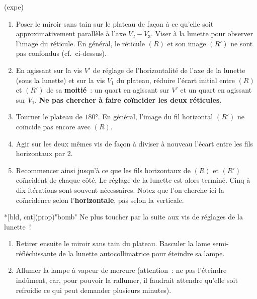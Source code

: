 \documentclass[../main/main.tex]{subfiles}
\begin{document}
\begin{tcb}(expe){}
  \begin{enumerate}
  \item Poser le miroir sans tain sur le plateau de façon à ce qu'elle soit
  approximativement parallèle à l'axe $V_2-V_3$. Viser à la lunette pour
  observer l'image du réticule. En général, le réticule $(R)$ et son image
  $(R')$ ne sont pas  confondus (cf.\ ci-dessus).

  \item En agissant sur la vis $V'$ de réglage de l'horizontalité de l'axe de
  la lunette (sous la lunette) et sur la vis $V_1$ du plateau, réduire l'écart
  initial entre $(R)$ et $(R')$ de sa \textbf{moitié}~: un quart en agissant sur
  $V'$ et un quart en agissant sur $V_1$. \textbf{Ne pas chercher à faire
  coïncider les deux réticules}.

  \item Tourner le plateau de $\ang{180;;}$. En général, l'image du fil
  horizontal $(R')$ ne coïncide pas encore avec $(R)$.

  \item Agir sur les deux mêmes vis de façon à diviser à nouveau l'écart entre
  les fils horizontaux par 2.

  \item Recommencer ainsi jusqu'à ce que les fils horizontaux de $(R)$ et
  $(R')$ coïncident de chaque côté. Le réglage de la lunette est alors terminé.
  Cinq à dix itérations sont souvent nécessaires. Notez que l'on cherche ici la
  coïncidence selon l'\textbf{horizontale}, pas selon la verticale.

  \end{enumerate}

\begin{tcb}*[bld, cnt](prop)"bomb"{}
  Ne plus toucher par la suite aux vis de réglages de la lunette~!
\end{tcb}

\begin{enumerate}[resume]
  \item Retirer ensuite le miroir sans tain du plateau. Basculer la lame
    semi-réfléchissante de la lunette autocollimatrice pour éteindre sa lampe.

  \item Allumer la lampe à vapeur de mercure (attention~: ne pas l'éteindre
    indûment, car, pour pouvoir la rallumer, il faudrait attendre qu'elle soit
    refroidie ce qui peut demander plusieurs minutes).
\end{enumerate}

\end{tcb}
\end{document}
